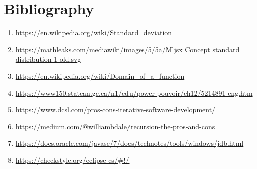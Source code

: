\documentclass{scrartcl}
\begin{document}
\newpage

\section{Bibliography}

\begin{spacing}{1}
\begin{Large}
\begin{enumerate}
    \item \label{key1}\href{https://en.wikipedia.org/wiki/Standard_deviation}{https://en.wikipedia.org/wiki/Standard\_deviation}
    \item \label{key2}\href{https://mathleaks.com/mediawiki/images/5/5a/Mljsx_Concept_standard_distribution_1_old.svg}{https://mathleaks.com/mediawiki/images/5/5a/Mljsx Concept standard distribution 1 old.svg}
    \item \label{key3} \href{https://en.wikipedia.org/wiki/Domain\_of\_a\_function}{https://en.wikipedia.org/wiki/Domain\_of\_a\_function}
    \item \label{key4} \href{https://www150.statcan.gc.ca/n1/edu/power-pouvoir/ch12/5214891-eng.htm}{https://www150.statcan.gc.ca/n1/edu/power-pouvoir/ch12/5214891-eng.htm} 
    \item \label{key5} \href{https://www.dcsl.com/pros-cons-iterative-software-development/}{https://www.dcsl.com/pros-cons-iterative-software-development/}
    \item \label{key6} \href{https://medium.com/@williambdale/recursion-the-pros-and-cons-76d32d75973a}{https://medium.com/@williambdale/recursion-the-pros-and-cons} 
    \item \label{key7} \href{https://docs.oracle.com/javase/7/docs/technotes/tools/windows/jdb.html#:~:text=The\%20Java\%20Debugger\%2C\%20jdb\%2C\%20is,or\%20remote\%20Java\%20Virtual\%20Machine.}{https://docs.oracle.com/javase/7/docs/technotes/tools/windows/jdb.html}
    \item \label{key8} \href{https://checkstyle.org/eclipse-cs/#!/}{https://checkstyle.org/eclipse-cs/\#!/}
\end{enumerate}
\end{Large}
\end{spacing}
\end{document}
